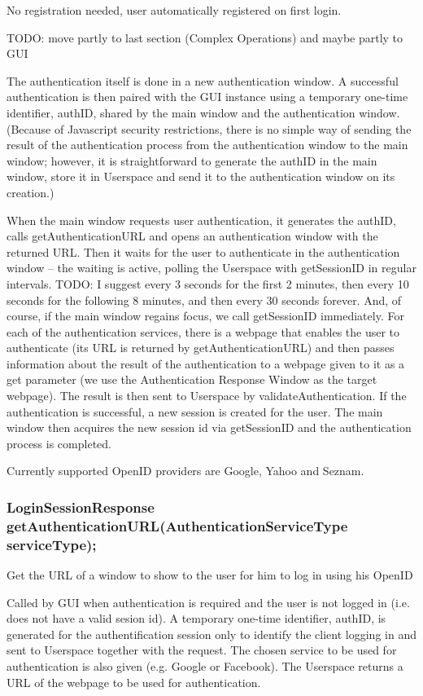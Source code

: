 No registration needed, user automatically registered on first login.

TODO: move partly to last section (Complex Operations) and maybe partly to GUI

The authentication itself is done in a new authentication window.
A successful authentication is then paired with the GUI instance using a temporary one-time identifier, authID, shared by the main window and the authentication window.
(Because of Javascript security restrictions, there is no simple way of sending the result of the authentication process from the authentication window to the main window;
however, it is straightforward to generate the authID in the main window, store it in Userspace and send it to the authentication window on its creation.)

When the main window requests user authentication, it generates the authID, calls getAuthenticationURL and opens an authentication window with the returned URL.
Then it waits for the user to authenticate in the authentication window
-- the waiting is active, polling the Userspace with getSessionID in regular intervals.
TODO: I suggest every 3 seconds for the first 2 minutes, then every 10 seconds for the following 8 minutes, and then every 30 seconds forever.
And, of course, if the main window regains focus, we call getSessionID immediately.
For each of the authentication services, there is a webpage that enables the user to authenticate
(its URL is returned by getAuthenticationURL)
and then passes information about the result of the authentication to a webpage given to it as a get parameter
(we use the Authentication Response Window as the target webpage).
The result is then sent to Userspace by validateAuthentication.
If the authentication is successful, a new session is created for the user.
The main window then acquires the new session id via getSessionID and the authentication process is completed.

Currently supported OpenID providers are Google, Yahoo and Seznam.

\subsubsection{LoginSessionResponse getAuthenticationURL(AuthenticationServiceType serviceType);}
Get the URL of a window to show to the user for him to log in using his OpenID

Called by GUI when authentication is required and the user is not logged in (i.e. does not have a valid sesion id).
A temporary one-time identifier, authID, is generated for the authentification session only to identify the client logging in and sent to Userspace together with the request.
The chosen service to be used for authentication is also given (e.g. Google or Facebook).
The Userspace returns a URL of the webpage to be used for authentication.

